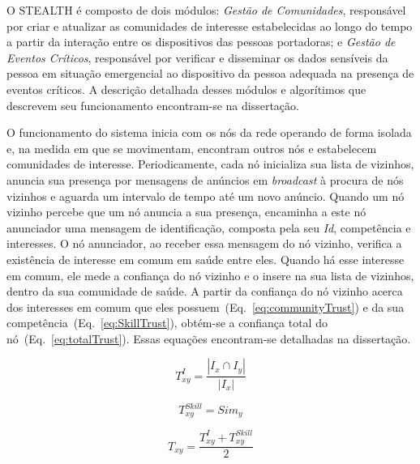\documentclass[12pt]{article}
\begin{document}
O \mbox{STEALTH} é composto de dois módulos: {\it Gestão de Comunidades}, responsável por criar e atualizar as comunidades de interesse estabelecidas ao longo do tempo a partir da interação entre os dispositivos das pessoas portadoras; e {\it Gestão de Eventos Críticos}, responsável por verificar e disseminar os dados sensíveis da pessoa em situação emergencial ao dispositivo da pessoa adequada na presença de eventos críticos. A descrição detalhada desses módulos e algorítimos que descrevem seu funcionamento encontram-se na dissertação. 

O funcionamento do sistema inicia com os nós da rede operando de forma isolada e, na medida em que se movimentam, encontram outros nós e estabelecem comunidades de interesse. Periodicamente, cada nó inicializa sua lista de vizinhos, anuncia sua presença por mensagens de anúncios em \textit{broadcast} à procura de nós vizinhos e aguarda um intervalo de tempo até um novo anúncio.  Quando um nó vizinho percebe que um nó anuncia a sua presença, encaminha a este nó anunciador uma mensagem de identificação, composta pela seu \textit{Id}, competência e interesses. O nó anunciador, ao receber essa mensagem do nó vizinho, verifica a existência de interesse em comum em saúde entre eles. Quando há esse interesse em comum, ele mede a confiança do nó vizinho e o insere na sua lista de vizinhos, dentro da sua comunidade de saúde. A partir da confiança do nó vizinho acerca dos interesses em comum que eles possuem~(Eq.~\ref{eq:communityTrust}) e da sua competência~(Eq.~\ref{eq:SkillTrust}), obtém-se a confiança total do nó~(Eq.~\ref{eq:totalTrust}). Essas equações encontram-se detalhadas na dissertação.

\noindent
\begin{minipage}{.3\linewidth}
\centering
\begin{equation}
T_{xy}^{I} = \frac {|I_x \cap I_y|}{|I_x|}
\label{eq:communityTrust}
\end{equation}
\end{minipage}
\begin{minipage}{.3\linewidth}
\centering
\begin{equation}
T_{xy}^{Skill} = Sim_y
\label{eq:SkillTrust}
\end{equation}
\end{minipage}
\hspace{0.5cm}
\begin{minipage}{.3\linewidth}
\centering
\begin{equation}
T_{xy} = \frac{T_{xy}^{I} + T_{xy}^{Skill}}{2}
\label{eq:totalTrust}
\end{equation}
\end{minipage}
\end{document}
